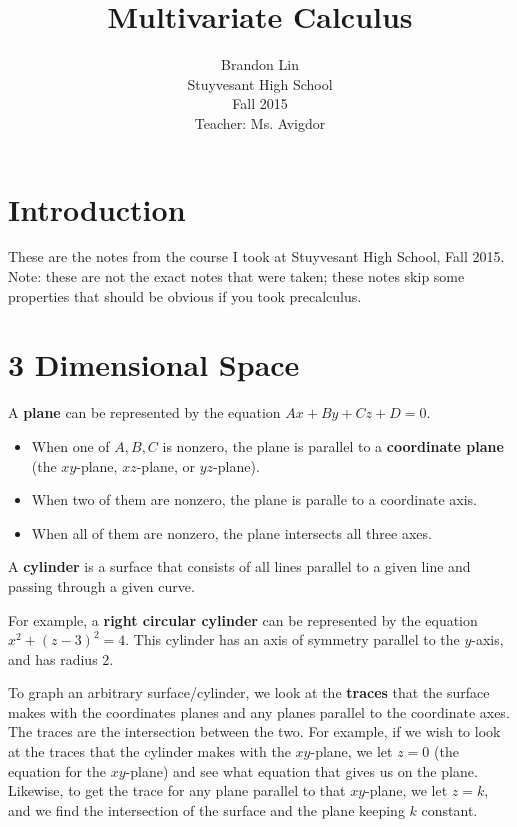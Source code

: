 \documentclass[12pt]{article}
\begin{document}
\title{Multivariate Calculus}
\author{Brandon Lin\\Stuyvesant High School\\Fall 2015\\Teacher: Ms. Avigdor}
\maketitle
\newpage


\tableofcontents
\newpage
\section*{Introduction}
These are the notes from the course I took at Stuyvesant High School, Fall 2015. Note: these are not the exact notes that were taken; these notes skip some properties that should be obvious if you took precalculus.
\section{3 Dimensional Space}
A \textbf{plane} can be represented by the equation $Ax + By + Cz + D = 0$. 
\begin{itemize}
\item When one of $A,B,C$ is nonzero, the plane is parallel to a \textbf{coordinate plane} (the $xy$-plane, $xz$-plane, or $yz$-plane).
\item When two of them are nonzero, the plane is paralle to a coordinate axis.
\item When all of them are nonzero, the plane intersects all three axes.
\end{itemize}

A \textbf{cylinder} is a surface that consists of all lines parallel to a given line and passing through a given curve. 

For example, a \textbf{right circular cylinder} can be represented by the equation $x^2 + (z-3)^2 = 4$. This cylinder has an axis of symmetry parallel to the $y$-axis, and has radius 2.

To graph an arbitrary surface/cylinder, we look at the \textbf{traces} that the surface makes with the coordinates planes and any planes parallel to the coordinate axes. The traces are the intersection between the two. For example, if we wish to look at the traces that the cylinder makes with the $xy$-plane, we let $z=0$ (the equation for the $xy$-plane) and see what equation that gives us on the plane. Likewise, to get the trace for any plane parallel to that $xy$-plane, we let $z=k$, and we find the intersection of the surface and the plane keeping $k$ constant.
\end{document}
